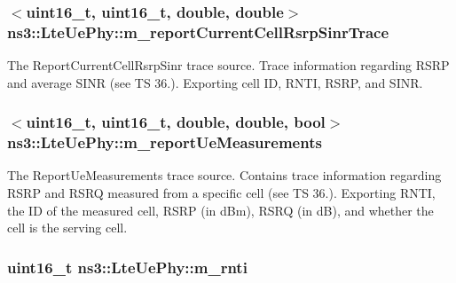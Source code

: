 \subsubsection[{\texorpdfstring{m\+\_\+report\+Current\+Cell\+Rsrp\+Sinr\+Trace}{m_reportCurrentCellRsrpSinrTrace}}]{$<$uint16\+\_\+t, uint16\+\_\+t, double, double$>$ ns3\+::\+Lte\+Ue\+Phy\+::m\+\_\+report\+Current\+Cell\+Rsrp\+Sinr\+Trace\hspace{0.3cm}{\ttfamily [private]}}\hypertarget{classns3_1_1LteUePhy_aded24128cc664f9a3ef6e70d3c3fc430}{}\label{classns3_1_1LteUePhy_aded24128cc664f9a3ef6e70d3c3fc430}
The {\ttfamily Report\+Current\+Cell\+Rsrp\+Sinr} trace source. Trace information regarding R\+S\+RP and average S\+I\+NR (see TS 36.). Exporting cell ID, R\+N\+TI, R\+S\+RP, and S\+I\+NR. 
\subsubsection[{\texorpdfstring{m\+\_\+report\+Ue\+Measurements}{m_reportUeMeasurements}}]{$<$uint16\+\_\+t, uint16\+\_\+t, double, double, bool$>$ ns3\+::\+Lte\+Ue\+Phy\+::m\+\_\+report\+Ue\+Measurements\hspace{0.3cm}{\ttfamily [private]}}\hypertarget{classns3_1_1LteUePhy_a6441358870b99ebb18253bc646702af9}{}\label{classns3_1_1LteUePhy_a6441358870b99ebb18253bc646702af9}
The {\ttfamily Report\+Ue\+Measurements} trace source. Contains trace information regarding R\+S\+RP and R\+S\+RQ measured from a specific cell (see TS 36.). Exporting R\+N\+TI, the ID of the measured cell, R\+S\+RP (in d\+Bm), R\+S\+RQ (in dB), and whether the cell is the serving cell. 
\subsubsection[{\texorpdfstring{m\+\_\+rnti}{m_rnti}}]{\setlength{\rightskip}{0pt plus 5cm}uint16\+\_\+t ns3\+::\+Lte\+Ue\+Phy\+::m\+\_\+rnti\hspace{0.3cm}{\ttfamily [private]}}\hypertarget{classns3_1_1LteUePhy_a887b5dc4e246a308cd09127b64ed8fac}{}\label{classns3_1_1LteUePhy_a887b5dc4e246a308cd09127b64ed8fac}

